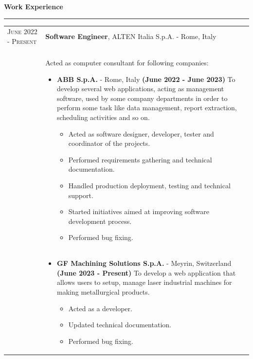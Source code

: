 \documentclass[english,10pt,a4paper]{article}
\newcommand{\CvSection}[2]{\vspace{0.5cm}
	{\LARGE \textcolor{CvColor}{#1 \hspace{2pt} \textbf{#2}}} \\
	\textcolor{CvColor}{\rule[.5\baselineskip]{0.5\textwidth}{0.5pt}}}
\newcommand{\CvTimeRange}[2]{\textcolor{CvColor}{\textsc{#1 - #2}}}
\def\SidebarHSize{3.5cm}
\def\BodyHSize{11cm}
\begin{document}
	\CvSection{\faBriefcase}{Work Experience}

	\begin{longtable}{p{\SidebarHSize}|p{\BodyHSize}}
		\CvTimeRange{June 2022}{Present} & \textbf{Software Engineer}, ALTEN Italia S.p.A. - Rome, Italy \\
		& \\
		& Acted as computer consultant for following companies: 
		  \begin{itemize}
			\item \textbf{ABB S.p.A.} - Rome, Italy \newline
			\textbf{(June 2022 - June 2023)} \newline
			To develop several web applications, acting as management software, used by some company departments in order to perform some task like data management, report extraction, scheduling activities and so on.
			\begin{itemize}
				\item Acted as software designer, developer, tester and coordinator of the projects.
				\item Performed requirements gathering and technical documentation.
				\item Handled production deployment, testing and technical support.
				\item Started initiatives aimed at improving software development process.
				\item Performed bug fixing.
			\end{itemize}
		\end{itemize} \\
		& \begin{itemize}
			\item \textbf{GF Machining Solutions S.p.A.} - Meyrin, Switzerland \newline
			\textbf{(June 2023 - Present)} \newline
			To develop a web application that allows users to setup, manage laser industrial machines for making metallurgical products.
			\begin{itemize}
				\item Acted as a developer.
				\item Updated technical documentation.
				\item Performed bug fixing.
			\end{itemize}
		\end{itemize}
	\end{longtable}
	
\end{document}

